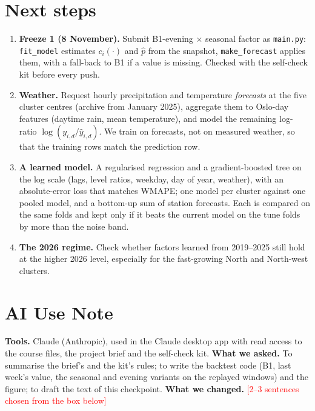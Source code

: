 \documentclass[10pt,a4paper]{article}
\begin{document}
\section{Next steps}
\begin{enumerate}
  \item \textbf{Freeze 1 (8 November).} Submit B1-evening $\times$ seasonal factor as
        \texttt{main.py}: \texttt{fit\_model} estimates $c_i(\cdot)$ and $\hat p$ from the
        snapshot, \texttt{make\_forecast} applies them, with a fall-back to B1 if a value is
        missing. Checked with the self-check kit before every push.
  \item \textbf{Weather.} Request hourly precipitation and temperature \emph{forecasts} at the five
        cluster centres (archive from January 2025), aggregate them to Oslo-day features
        (daytime rain, mean temperature), and model the remaining log-ratio
        $\log(y_{i,d}/\hat y_{i,d})$. We train on forecasts, not on measured weather, so that the
        training rows match the prediction row.
  \item \textbf{A learned model.} A regularised regression and a gradient-boosted tree on the log
        scale (lags, level ratios, weekday, day of year, weather), with an absolute-error loss
        that matches WMAPE; one model per cluster against one pooled model, and a bottom-up sum
        of station forecasts. Each is compared on the same folds and kept only if it beats the
        current model on the tune folds by more than the noise band.
  \item \textbf{The 2026 regime.} Check whether factors learned from 2019--2025 still hold at the
        higher 2026 level, especially for the fast-growing North and North-west clusters.
\end{enumerate}

\section*{AI Use Note}
\textbf{Tools.} Claude (Anthropic), used in the Claude desktop app with read access to the course
files, the project brief and the self-check kit.
\textbf{What we asked.} To summarise the brief's and the kit's rules; to write the backtest code
(B1, last week's value, the seasonal and evening variants on the replayed windows) and the figure;
to draft the text of this checkpoint.
\textbf{What we changed.} \textcolor{red}{[2--3 sentences chosen from the box below]}
\end{document}

